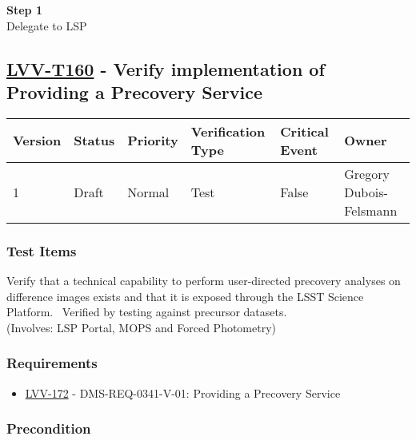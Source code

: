 \textbf{Step 1}\\
Delegate to LSP\\[2\baselineskip]

\hypertarget{lvv-t160---verify-implementation-of-providing-a-precovery-service}{\subsection{\texorpdfstring{\href{https://jira.lsstcorp.org/secure/Tests.jspa\#/testCase/LVV-T160}{LVV-T160}
- Verify implementation of Providing a Precovery
Service}{LVV-T160 - Verify implementation of Providing a Precovery Service}}\label{lvv-t160---verify-implementation-of-providing-a-precovery-service}}

\begin{longtable}[]{@{}llllll@{}}
\toprule
Version & Status & Priority & Verification Type & Critical Event &
Owner\tabularnewline
\midrule
\endhead
1 & Draft & Normal & Test & False & Gregory
Dubois-Felsmann\tabularnewline
\bottomrule
\end{longtable}

\subsubsection{Test Items}\label{test-items-27}

Verify that a technical capability to perform user-directed precovery
analyses on difference images exists and that it is exposed through the
LSST Science Platform. ~Verified by testing against precursor
datasets.\\
(Involves: LSP Portal, MOPS and Forced Photometry)

\subsubsection{Requirements}\label{requirements-27}

\begin{itemize}
\tightlist
\item
  \href{https://jira.lsstcorp.org/browse/LVV-172}{LVV-172} -
  DMS-REQ-0341-V-01: Providing a Precovery Service
\end{itemize}

\subsubsection{Precondition}\label{precondition-2}

